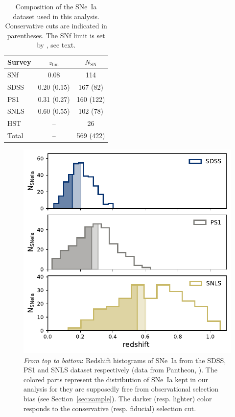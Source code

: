 \documentclass[]{aa}
\begin{document}
\begin{table}
    \centering
    \caption{Composition of the SNe~Ia dataset used in this analysis.
    Conservative cuts are indicated in parentheses. The SNf limit is set
by \cite{rigault2020}, see text.}
    \label{tab:sample}
    \begin{tabular}{l c c}
        \hline\hline
        Survey & $z_{\lim}$ & $N_{\mathrm{SN}}$ \\
        \hline
        SNf & 0.08 & 114 \\
        SDSS & 0.20 (0.15) & 167 (82)\\
        PS1 & 0.31 (0.27) & 160 (122)\\
        SNLS & 0.60 (0.55) & 102 (78)\\
        HST & -- & 26 \\
        \hline
        Total & -- & 569 (422) \\
        \hline
    \end{tabular}
\end{table}

\begin{figure}
    \centering
    \includegraphics[width=0.95\linewidth]{Article_figures/hist_surveys_cuts_55-cividis.pdf}
    \caption{\textit{From top to bottom}: Redshift histograms of SNe~Ia from the
        SDSS, PS1 and SNLS dataset respectively (data from Pantheon,
        \citealt{scolnic2018a}). The colored parts represent the distribution of
        SNe~Ia kept in our analysis for they are supposedly free from
    observational selection bias (see Section~\ref{sec:sample}). The
darker (resp. lighter) color responds to the conservative (resp. fiducial)
selection cut.}
    \label{fig:cuts}
\end{figure}
\end{document}
